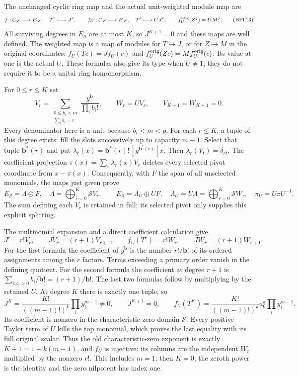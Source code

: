 The unchanged cyclic ring map and the actual unit-weighted module map are
\[
 f:\mathcal C_{\mathscr S}\longrightarrow E_{\mathscr S},\quad T^r\longmapsto J^r,
 \qquad
 f_U:\mathcal C_{\mathscr S}\longrightarrow E_{\mathscr S},\quad T^r\longmapsto UJ^r,
 \qquad f_U^{\rm orig}(Z^j)=UM^j .
\tag{BPC.3}\label{eq:bpc3}
\]
All surviving degrees in \(E_{\mathscr S}\) are at most \(K\), so
\(J^{K+1}=0\) and these maps are well defined.  The weighted
map is a map of modules for \(T\mapsto J\), or for
\(Z\mapsto M\) in the original coordinates:
\(f_U(Tc)=Jf_U(c)\) and \(f_U^{\rm orig}(Zc)=Mf_U^{\rm orig}(c)\).
Its value at one is the actual \(U\).  These formulas also give
its type when \(U\ne1\); they do not require it to be a unital
ring homomorphism.

For \(0\leq r\leq K\) set
\[
 V_r=\sum_{\substack{0\leq b_i<m\\\sum_i b_i=r}}
                  \frac{y^{\mathbf b}}{\prod_i b_i!},
 \qquad W_r=UV_r,\qquad V_{K+1}=W_{K+1}=0.
\tag{BPC.4}\label{eq:bpc4}
\]
Every denominator here is a unit because \(b_i<m<p\).
For each \(r\leq K\), a tuple of this degree exists: fill the
slots successively up to capacity \(m-1\).  Select that tuple
\(\mathbf b^*(r)\) and put
\(\lambda_r(x)=\mathbf b^*(r)!\,[y^{\mathbf b^*(r)}]x\).
Then \(\lambda_r(V_t)=\delta_{rt}\).  The coefficient projection
\(\pi(x)=\sum_r\lambda_r(x)V_r\) deletes every selected pivot
coordinate from \(x-\pi(x)\).  Consequently, with \(F\) the
span of all unselected monomials, the maps just given prove
\[
 E_{\mathscr S}=\Lambda\oplus F,\quad
 \Lambda=\bigoplus_{r=0}^K \mathscr S V_r,\qquad
 E_{\mathscr S}=\Lambda_U\oplus UF,\quad
 \Lambda_U=U\Lambda=\bigoplus_{r=0}^K \mathscr S W_r,
 \quad\pi_U=U\pi U^{-1}.
\tag{BPC.5}\label{eq:bpc5}
\]
The sum defining each \(V_r\) is retained in full; its selected
pivot only supplies this explicit splitting.

The multinomial expansion and a direct coefficient calculation give
\[
 J^r=r!V_r,\qquad JV_r=(r+1)V_{r+1},\qquad
 f_U(T^r)=r!W_r,\qquad JW_r=(r+1)W_{r+1}.
\tag{BPC.6}\label{eq:bpc6}
\]
For the first formula the coefficient of \(y^{\mathbf b}\) is
the number \(r!/\mathbf b!\) of its ordered assignments among
the \(r\) factors.  Terms exceeding a primary order vanish in
the defining quotient.  For the second formula the coefficient
at degree \(r+1\) is
\(\sum_{i:b_i>0}b_i/\mathbf b!=(r+1)/\mathbf b!\).
The last two formulas follow by multiplying by the retained
\(U\).  At degree \(K\) there is exactly one tuple, so
\[
 J^K=\frac{K!}{((m-1)!)^k}\prod_i y_i^{m-1}\ne0,
 \qquad J^{K+1}=0,
 \qquad
 f_U(T^K)=\frac{K!}{((m-1)!)^k}a_0^k\prod_i y_i^{m-1}.
\tag{BPC.7}\label{eq:bpc7}
\]
Its coefficient is nonzero in the characteristic-zero domain
\(\mathscr S\).  Every positive Taylor term of \(U\) kills the top
monomial, which proves the last equality with its full original
scalar.  Thus the old characteristic-zero exponent is exactly
\(K+1=1+k(m-1)\), and \(f_U\) is injective: its columns are
the independent \(W_r\) multiplied by the nonzero \(r!\).
This includes \(m=1\): then \(K=0\), the zeroth power is the
identity and the zero nilpotent has index one.

